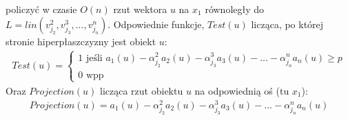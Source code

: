 \documentclass[magisterska]{pracamgr}
\theoremstyle{plain}
\theoremstyle{definition}
\theoremstyle{remark}
\begin{document}
policzyć w czasie $O(n)$ rzut wektora $u$ na $x_1$ równoległy do $L = lin(v_{j_2}^2, v_{j_3}^3, ..., v_{j_n}^n)$. Odpowiednie funkcje, $Test(u)$
licząca, po której stronie hiperpłaszczyzny jest obiekt $u$:
\begin{align*}
 Test(u) = \begin{cases} 1 \text{ jeśli } a_1(u) - \alpha_{j_2}^2 a_2(u) - \alpha_{j_3}^3 a_3(u) - 
 ... - \alpha_{j_n}^n a_n(u) \geq p \\ 0 \text{ wpp } \end{cases}
\end{align*}
Oraz $Projection(u)$ licząca rzut obiektu $u$ na odpowiednią oś (tu $x_1$):
\begin{align*}
 Projection(u) = a_1(u) - \alpha_{j_2}^2 a_2(u) - \alpha_{j_3}^3 a_3(u) - ... - \alpha_{j_n}^n a_n(u)
\end{align*}
\end{document}
